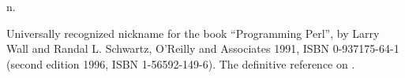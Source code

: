  n.

Universally recognized nickname for the book ``Programming Perl'', by Larry Wall
and Randal L. Schwartz, O'Reilly and Associates 1991, ISBN 0-937175-64-1 (second
edition 1996, ISBN 1-56592-149-6). The definitive reference on .

